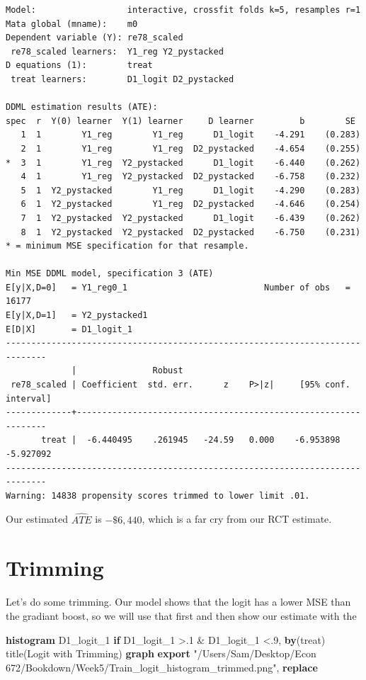 \documentclass[
]{book}
\newenvironment{Shaded}{\begin{snugshade}}{\end{snugshade}}
\newcommand{\BaseNTok}[1]{\textcolor[rgb]{0.00,0.00,0.81}{#1}}
\newcommand{\KeywordTok}[1]{\textcolor[rgb]{0.13,0.29,0.53}{\textbf{#1}}}
\newcommand{\NormalTok}[1]{#1}
\newcommand{\StringTok}[1]{\textcolor[rgb]{0.31,0.60,0.02}{#1}}
\begin{document}
\begin{verbatim}
Model:                  interactive, crossfit folds k=5, resamples r=1
Mata global (mname):    m0
Dependent variable (Y): re78_scaled
 re78_scaled learners:  Y1_reg Y2_pystacked
D equations (1):        treat
 treat learners:        D1_logit D2_pystacked

DDML estimation results (ATE):
spec  r  Y(0) learner  Y(1) learner     D learner         b        SE 
   1  1        Y1_reg        Y1_reg      D1_logit    -4.291    (0.283)
   2  1        Y1_reg        Y1_reg  D2_pystacked    -4.654    (0.255)
*  3  1        Y1_reg  Y2_pystacked      D1_logit    -6.440    (0.262)
   4  1        Y1_reg  Y2_pystacked  D2_pystacked    -6.758    (0.232)
   5  1  Y2_pystacked        Y1_reg      D1_logit    -4.290    (0.283)
   6  1  Y2_pystacked        Y1_reg  D2_pystacked    -4.646    (0.254)
   7  1  Y2_pystacked  Y2_pystacked      D1_logit    -6.439    (0.262)
   8  1  Y2_pystacked  Y2_pystacked  D2_pystacked    -6.750    (0.231)
* = minimum MSE specification for that resample.

Min MSE DDML model, specification 3 (ATE)
E[y|X,D=0]   = Y1_reg0_1                           Number of obs   =     16177
E[y|X,D=1]   = Y2_pystacked1
E[D|X]       = D1_logit_1
------------------------------------------------------------------------------
             |               Robust
 re78_scaled | Coefficient  std. err.      z    P>|z|     [95% conf. interval]
-------------+----------------------------------------------------------------
       treat |  -6.440495    .261945   -24.59   0.000    -6.953898   -5.927092
------------------------------------------------------------------------------
Warning: 14838 propensity scores trimmed to lower limit .01.
\end{verbatim}

Our estimated \(\widehat{ATE}\) is \(-\$6,440\), which is a far cry from our RCT estimate.

\section{Trimming}\label{trimming}

Let's do some trimming. Our model shows that the logit has a lower MSE than the gradiant boost, so we will use that first and then show our estimate with the

\begin{Shaded}
\begin{Highlighting}[]
\KeywordTok{histogram}\NormalTok{ D1\_logit\_1 }\KeywordTok{if}\NormalTok{ D1\_logit\_1 \textgreater{}.1 \& D1\_logit\_1 \textless{}.9, }\KeywordTok{by}\NormalTok{(treat) }\BaseNTok{title}\NormalTok{(Logit with Trimming)}
\KeywordTok{graph} \KeywordTok{export} \StringTok{"/Users/Sam/Desktop/Econ 672/Bookdown/Week5/Train\_logit\_histogram\_trimmed.png"}\NormalTok{, }\KeywordTok{replace}
\end{Highlighting}
\end{Shaded}
\end{document}
